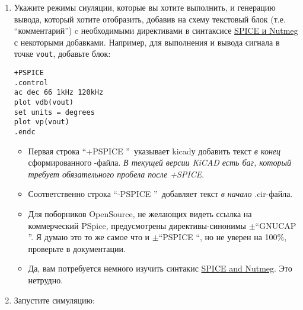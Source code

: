 \begin{enumerate}
  \item
Укажите режимы сиуляции, которые вы хотите выполнить, и генерацию вывода,
который хотите отобразить, добавив на схему текстовый блок (т.е.
``комментарий'') c необходимыми директивами в синтаксисе
\href{http://newton.ex.ac.uk/teaching/cdhw/Electronics2/userguide/sec5.html}{SPICE и Nutmeg}
с некоторыми добавками. Например, для выполнения  и вывода сигнала в точке \verb|vout|, добавьте блок:
\begin{lstlisting}
+PSPICE
.control
ac dec 66 1kHz 120kHz
plot vdb(vout)
set units = degrees
plot vp(vout)
.endc
\end{lstlisting}
\begin{itemize}
  \item
Первая строка ``+PSPICE ''\ указывает kicadу добавить текст \emph{в конец}
сформированного -файла. \emph{В текущей версии KiCAD есть баг,
который требует обязательного пробела после +SPICE}.
  \item
Соответственно строка ``-PSPICE ''\ добавляет текст \emph{в начало} .cir-файла.
  \item
Для поборников OpenSource, не желающих видеть ссылка на коммерческий PSpice,
предусмотрены директивы-синонимы $\pm$``GNUCAP ''. Я думаю это то же самое что и
$\pm$``PSPICE ``, но не уверен на 100\%, проверьте в документации.
  \item
Да, вам потребуется немного изучить синтакис
\href{http://newton.ex.ac.uk/teaching/cdhw/Electronics2/userguide/sec5.html}{SPICE
and Nutmeg}. Это нетрудно.
\end{itemize}
  \item
Запустите симуляцию:



\end{enumerate}

\secup
